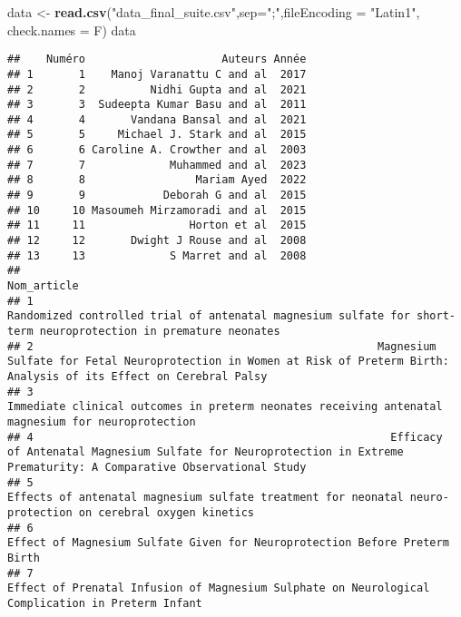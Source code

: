 \documentclass[
]{article}
\newenvironment{Shaded}{\begin{snugshade}}{\end{snugshade}}
\newcommand{\AttributeTok}[1]{\textcolor[rgb]{0.13,0.29,0.53}{#1}}
\newcommand{\FunctionTok}[1]{\textcolor[rgb]{0.13,0.29,0.53}{\textbf{#1}}}
\newcommand{\NormalTok}[1]{#1}
\newcommand{\OtherTok}[1]{\textcolor[rgb]{0.56,0.35,0.01}{#1}}
\newcommand{\StringTok}[1]{\textcolor[rgb]{0.31,0.60,0.02}{#1}}
\begin{document}
\begin{Shaded}
\begin{Highlighting}[]
\NormalTok{data }\OtherTok{\textless{}{-}} \FunctionTok{read.csv}\NormalTok{(}\StringTok{"data\_final\_suite.csv"}\NormalTok{,}\AttributeTok{sep=}\StringTok{";"}\NormalTok{,}\AttributeTok{fileEncoding =} \StringTok{"Latin1"}\NormalTok{, }\AttributeTok{check.names =}\NormalTok{ F)}
\NormalTok{data}
\end{Highlighting}
\end{Shaded}

\begin{verbatim}
##    Numéro                     Auteurs Année
## 1       1    Manoj Varanattu C and al  2017
## 2       2          Nidhi Gupta and al  2021
## 3       3  Sudeepta Kumar Basu and al  2011
## 4       4       Vandana Bansal and al  2021
## 5       5     Michael J. Stark and al  2015
## 6       6 Caroline A. Crowther and al  2003
## 7       7             Muhammed and al  2023
## 8       8                 Mariam Ayed  2022
## 9       9            Deborah G and al  2015
## 10     10 Masoumeh Mirzamoradi and al  2015
## 11     11                Horton et al  2015
## 12     12       Dwight J Rouse and al  2008
## 13     13             S Marret and al  2008
##                                                                                                                                                                   Nom_article
## 1                                                             Randomized controlled trial of antenatal magnesium sulfate for short-term neuroprotection in premature neonates
## 2                                                     Magnesium Sulfate for Fetal Neuroprotection in Women at Risk of Preterm Birth: Analysis of its Effect on Cerebral Palsy
## 3                                                                           Immediate clinical outcomes in preterm neonates receiving antenatal magnesium for neuroprotection
## 4                                                       Efficacy of Antenatal Magnesium Sulfate for Neuroprotection in Extreme Prematurity: A Comparative Observational Study
## 5                                                                  Effects of antenatal magnesium sulfate treatment for neonatal neuro-protection on cerebral oxygen kinetics
## 6                                                                                                  Effect of Magnesium Sulfate Given for Neuroprotection Before Preterm Birth
## 7                                                                            Effect of Prenatal Infusion of Magnesium Sulphate on Neurological Complication in Preterm Infant

\end{verbatim}
\end{document}
